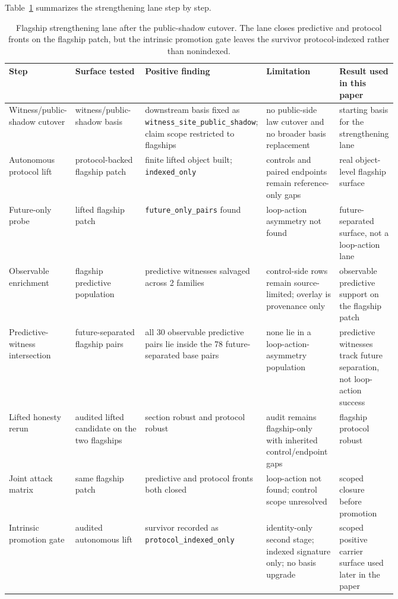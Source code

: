 \documentclass[11pt]{article}
\theoremstyle{definition}
\begin{document}
Table~\ref{tab:protocol-indexed-strengthening} summarizes the strengthening lane step by
step.

\begin{table}[t]
\centering
\footnotesize
\caption{Flagship strengthening lane after the public-shadow cutover. The lane closes
predictive and protocol fronts on the flagship patch, but the intrinsic promotion gate
leaves the survivor protocol-indexed rather than nonindexed.}
\label{tab:protocol-indexed-strengthening}
\begin{tabularx}{\linewidth}{@{}>{\raggedright\arraybackslash}p{0.14\linewidth}>{\raggedright\arraybackslash}p{0.20\linewidth}>{\raggedright\arraybackslash}p{0.22\linewidth}>{\raggedright\arraybackslash}p{0.20\linewidth}>{\raggedright\arraybackslash}X@{}}
\toprule
Step & Surface tested & Positive finding & Limitation & Result used in this paper \\
\midrule
Witness/public-shadow cutover & witness/public-shadow basis & downstream basis fixed as \nolinkurl{witness_site_public_shadow}; claim scope restricted to flagships & no public-side law cutover and no broader basis replacement & starting basis for the strengthening lane \\
Autonomous protocol lift & protocol-backed flagship patch & finite lifted object built; \texttt{indexed\_only} & controls and paired endpoints remain reference-only gaps & real object-level flagship surface \\
Future-only probe & lifted flagship patch & \texttt{future\_only\_pairs} found & loop-action asymmetry not found & future-separated surface, not a loop-action lane \\
Observable enrichment & flagship predictive population & 30 predictive witnesses salvaged across 2 families & control-side rows remain source-limited; overlay is provenance only & observable predictive support on the flagship patch \\
Predictive-witness intersection & future-separated flagship pairs & all 30 observable predictive pairs lie inside the 78 future-separated base pairs & none lie in a loop-action-asymmetry population & predictive witnesses track future separation, not loop-action success \\
Lifted honesty rerun & audited lifted candidate on the two flagships & section robust and protocol robust & audit remains flagship-only with inherited control/endpoint gaps & flagship protocol robust \\
Joint attack matrix & same flagship patch & predictive and protocol fronts both closed & loop-action not found; control scope unresolved & scoped closure before promotion \\
Intrinsic promotion gate & audited autonomous lift & survivor recorded as \texttt{protocol\_indexed\_only} & identity-only second stage; indexed signature only; no basis upgrade & scoped positive carrier surface used later in the paper \\
\bottomrule
\end{tabularx}
\end{table}
\end{document}
